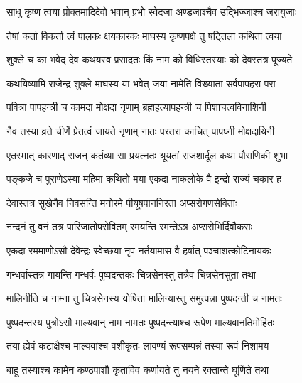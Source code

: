 \label{sec:padma-magha-shukla-jaya}

\ganapatyadiDhyanam
\padmaPuranam



\twolineshloka
{साधु कृष्ण त्वया प्रोक्तमादिदेवो भवान् प्रभो}
{स्वेदजा अण्डजाश्चैव उद्भिज्जाश्च जरायुजाः}%

\twolineshloka
{तेषां कर्ता विकर्ता त्वं पालकः क्षयकारकः}
{माघस्य कृष्णपक्षे तु षट्तिला कथिता त्वया}%

\twolineshloka
{शुक्ले च का भवेद् देव कथयस्व प्रसादतः}
{किं नाम को विधिस्तस्याः को देवस्तत्र पूज्यते}%


\twolineshloka
{कथयिष्यामि राजेन्द्र शुक्ले माघस्य या भवेत्}
{जया नामेति विख्याता सर्वपापहरा परा}%

\twolineshloka
{पवित्रा पापहन्त्री च कामदा मोक्षदा नृणाम्}
{ब्रह्महत्यापहन्त्री च पिशाचत्वविनाशिनी}%

\twolineshloka
{नैव तस्या व्रते चीर्णे प्रेतत्वं जायते नृणाम्}
{नातः परतरा काचित् पापघ्नी मोक्षदायिनी}%

\twolineshloka
{एतस्मात् कारणाद् राजन् कर्तव्या सा प्रयत्नतः}
{श्रूयतां राजशार्दूल कथा पौराणिकी शुभा}%

\twolineshloka
{पङ्कजे च पुराणेऽस्या महिमा कथितो मया}
{एकदा नाकलोके वै इन्द्रो राज्यं चकार ह}%

\twolineshloka
{देवास्तत्र सुखेनैव निवसन्ति मनोरमे}
{पीयूषपाननिरता अप्सरोगणसेविताः}%

\twolineshloka
{नन्दनं तु वनं तत्र पारिजातोपसेवितम्}
{रमयन्ति रमन्तेऽत्र अप्सरोभिर्दिवौकसः}%

\twolineshloka
{एकदा रममाणोऽसौ देवेन्द्रः स्वेच्छया नृप}
{नर्तयामास वै हर्षात् पञ्चाशत्कोटिनायकः}%

\twolineshloka
{गन्धर्वास्तत्र गायन्ति गन्धर्वः पुष्पदन्तकः}
{चित्रसेनस्तु तत्रैव चित्रसेनसुता तथा}%

\twolineshloka
{मालिनीति च नाम्ना तु चित्रसेनस्य योषिता}
{मालिन्यास्तु समुत्पन्ना पुष्पदन्ती च नामतः}%

\twolineshloka
{पुष्पदन्तस्य पुत्रोऽसौ माल्यवान् नाम नामतः}
{पुष्पदन्त्याश्च रूपेण माल्यवानतिमोहितः}%

\twolineshloka
{तया ह्येवं कटाक्षैश्च माल्यवांश्च वशीकृतः}
{लावण्यं रूपसम्पन्नं तस्या रूपं निशामय}%

\twolineshloka
{बाहू तस्याश्च कामेन कण्ठपाशौ कृताविव}
{कर्णायते तु नयने रक्तान्ते घूर्णिते तथा}%

